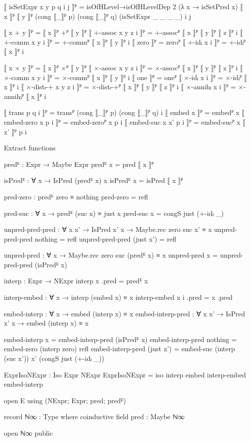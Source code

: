 \begin{code}[hide]
  ⟦ isSetExpr x y p q i j ⟧ᴾ =
    isOfHLevel→isOfHLevelDep 2 (λ x → isSetPred x)
      ⟦ x ⟧ᴾ ⟦ y ⟧ᴾ (cong ⟦_⟧ᴾ p) (cong ⟦_⟧ᴾ q) (isSetExpr _ _ _ _) i j

  ⟦ x + y ⟧ᴾ = ⟦ x ⟧ᴾ +ᴾ ⟦ y ⟧ᴾ
  ⟦ +-assoc x y z i ⟧ᴾ = +-assocᴾ ⟦ x ⟧ᴾ ⟦ y ⟧ᴾ ⟦ z ⟧ᴾ i
  ⟦ +-comm x y i ⟧ᴾ = +-commᴾ ⟦ x ⟧ᴾ ⟦ y ⟧ᴾ i
  ⟦ zero ⟧ᴾ = zeroᴾ
  ⟦ +-idₗ x i ⟧ᴾ = +-idₗᴾ ⟦ x ⟧ᴾ i

  ⟦ x × y ⟧ᴾ = ⟦ x ⟧ᴾ ×ᴾ ⟦ y ⟧ᴾ
  ⟦ ×-assoc x y z i ⟧ᴾ = ×-assocᴾ ⟦ x ⟧ᴾ ⟦ y ⟧ᴾ ⟦ z ⟧ᴾ i
  ⟦ ×-comm x y i ⟧ᴾ = ×-commᴾ ⟦ x ⟧ᴾ ⟦ y ⟧ᴾ i
  ⟦ one ⟧ᴾ = oneᴾ
  ⟦ ×-idₗ x i ⟧ᴾ = ×-idₗᴾ ⟦ x ⟧ᴾ i
  ⟦ ×-distₗ-+ x y z i ⟧ᴾ = ×-distₗ-+ᴾ ⟦ x ⟧ᴾ ⟦ y ⟧ᴾ ⟦ z ⟧ᴾ i
  ⟦ ×-annihₗ x i ⟧ᴾ = ×-annihₗᴾ ⟦ x ⟧ᴾ i

  ⟦ trans p q i ⟧ᴾ = transᴾ (cong ⟦_⟧ᴾ p) (cong ⟦_⟧ᴾ q) i
  ⟦ embed x ⟧ᴾ = embedᴾ x
  ⟦ embed-zero x p i ⟧ᴾ = embed-zeroᴾ x p i
  ⟦ embed-suc x x' p i ⟧ᴾ = embed-sucᴾ x ⟦ x' ⟧ᴾ p i
\end{code}
Extract functions
\begin{code}
  predᴱ : Expr → Maybe Expr
  predᴱ x = pred ⟦ x ⟧ᴾ

  isPredᴱ : ∀ x → IsPred (predᴱ x) x
  isPredᴱ x = isPred ⟦ x ⟧ᴾ
\end{code}
\begin{code}[hide]
  pred-zero : predᴱ zero ≡ nothing
  pred-zero = refl

  pred-suc : ∀ x → predᴱ (suc x) ≡ just x
  pred-suc x = congS just (+-idₗ _)

  unpred-pred-pred : ∀ {x x'} → IsPred x' x → Maybe.rec zero suc x' ≡ x
  unpred-pred-pred nothing = refl
  unpred-pred-pred (just x') = refl

  unpred-pred : ∀ x → Maybe.rec zero suc (predᴱ x) ≡ x
  unpred-pred x = unpred-pred-pred (isPredᴱ x)

  interp : Expr → NExpr
  interp x .pred = predᴱ x

  interp-embed : ∀ x → interp (embed x) ≡ x
  interp-embed x i .pred = x .pred

  embed-interp : ∀ x → embed (interp x) ≡ x
  embed-interp-pred : ∀ {x x'} → IsPred x' x → embed (interp x) ≡ x

  embed-interp x = embed-interp-pred (isPredᴱ x)
  embed-interp-pred nothing = embed-zero (interp zero) refl
  embed-interp-pred (just x') =
    embed-suc (interp (suc x')) x' (congS just (+-idₗ _))

  ExprIsoNExpr : Iso Expr NExpr
  ExprIsoNExpr = iso interp embed interp-embed embed-interp

open E using (NExpr; Expr; pred; predᴱ)

record ℕ∞ : Type where
  coinductive
  field pred : Maybe ℕ∞

open ℕ∞ public
\end{code}
